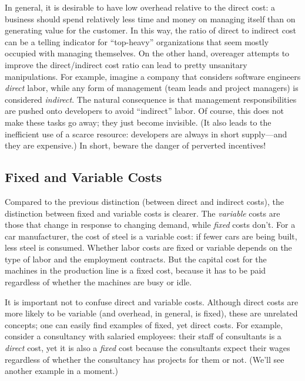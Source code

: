 In general, it is desirable to have low overhead relative to the
direct cost: a business should spend relatively less time and money on
managing itself than on generating value for the customer. In this
way, the ratio of direct to indirect cost can be a telling indicator
for ``top-heavy'' organizations that seem mostly occupied with
managing themselves. On the other hand, overeager attempts to improve
the direct/indirect cost ratio can lead to pretty unsanitary
manipulations. For example, imagine a company that considers software
engineers \emph{direct} labor, while\vadjust{\pagebreak} any form of management (team
leads and project managers) is considered \emph{indirect}. The natural
consequence is that management responsibilities are pushed onto
developers to avoid ``indirect'' labor. Of course, this does not make
these tasks go away; they just become invisible. (It also leads to the
inefficient use of a scarce resource: developers are always in short
supply---and they are expensive.)  In short, beware the danger of
perverted incentives!

\subsection{Fixed and Variable Costs}

  
Compared to the previous distinction (between direct and indirect
costs), the distinction between fixed and variable costs is clearer. The
\emph{variable} costs are those that change in response to changing
demand, while \emph{fixed} costs don't. For a car manufacturer, the
cost of steel is a variable cost: if fewer cars are being built, less
steel is consumed. Whether labor costs are fixed or variable depends
on the type of labor and the employment contracts.  But the capital
cost for the machines in the production line is a fixed cost, because
it has to be paid regardless of whether the machines are busy or idle.

It is important not to confuse direct and variable costs.  Although
direct costs are more likely to be variable (and overhead, in general,
is fixed), these are unrelated concepts; one can easily find examples
of fixed, yet direct costs. For example, consider a consultancy with
salaried employees: their staff of consultants is a \emph{direct}
cost, yet it is also a \emph{fixed} cost because the consultants
expect their wages regardless of whether the consultancy has projects
for them or not. (We'll see another example in a moment.)

